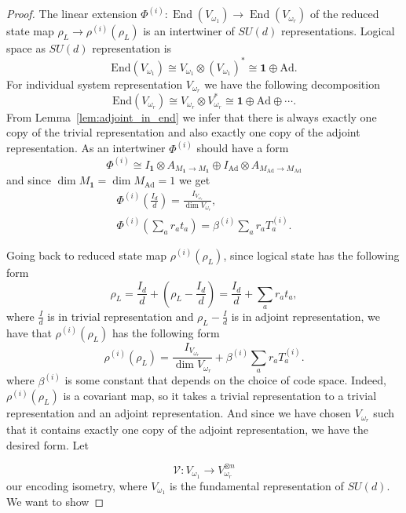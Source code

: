 \documentclass[10pt,twocolumn,superscriptaddress,aps,amsmath,amssymb,citeautoscript,floatfix,prx]{revtex4-2}
\theoremstyle{plain}
\theoremstyle{plain}
\theoremstyle{plain}
\theoremstyle{plain}
\theoremstyle{plain}
\theoremstyle{plain}
\theoremstyle{plain}
\theoremstyle{definition}
\theoremstyle{plain}
\begin{document}
\begin{appendix}
\begin{proof}
The linear extension $\Phi^{(i)}:\operatorname{End}(V_{\omega_1})\rightarrow \operatorname{End}(V_{\omega_r})$ of the reduced state map $\rho_L \rightarrow \rho^{(i)}\left(\rho_L\right)$ is an intertwiner of $SU(d)$ representations. 
Logical space as $SU(d)$ representation is
\[
     \text{End}(V_{\omega_1})\cong V_{\omega_1} \otimes (V_{\omega_1})^* \cong \mathbf{1} \oplus \mathrm{Ad}.
\]
For individual system representation $V_{\omega_r}$ we have the following decomposition
\[
    \text{End}(V_{\omega_r})\cong V_{\omega_r} \otimes V_{\omega_r}^* \cong \mathbf{1} \oplus \mathrm{Ad} \oplus \cdots.
\]
From Lemma~\ref{lem:adjoint_in_end} we infer that there is always exactly one copy of the trivial representation and also exactly one copy of the adjoint representation.
As an intertwiner $\Phi^{(i)}$ should have a form
\[
\Phi^{(i)}\cong I_{\mathbf{1}}\otimes A_{M_\mathbf{1}\rightarrow M_\mathbf{1}}\oplus I_{\mathrm{Ad}}\otimes A_{M_\mathrm{Ad}\rightarrow M_\mathrm{Ad}}
\]
and since $\dim M_\mathbf{1}=\dim M_\mathrm{Ad}=1$ we get
\begin{equation}
\begin{gathered}
        \Phi^{(i)}\left(\frac{I_d}{d}\right)=\frac{I_{V_{\omega_r}}}{\operatorname{dim} V_{\omega_r}},\\
        \Phi^{(i)}\left(\sum_a r_a t_a\right)=\beta^{(i)}\sum_a r_a T_a^{(i)}.
\end{gathered}
\end{equation}

Going back to reduced state map $\rho^{(i)}\left(\rho_L\right)$, since logical state has the following form
\[
     \rho_L=\frac{I_d}{d}+\left(\rho_L-\frac{I_d}{d}\right)=\frac{I_d}{d}+\sum_a r_a t_a,
\]
where $\frac{I}{d}$ is in trivial representation and $\rho_L-\frac{I}{d}$ is in adjoint representation, we have that $\rho^{(i)}\left(\rho_L\right)$ has the following form
\[
    \rho^{(i)}\left(\rho_L\right) = \frac{I_{V_{\omega_r}}}{\operatorname{dim} V_{\omega_r}}+\beta^{(i)} \sum_a r_a T_a^{(i)}.
\]
where $\beta^{(i)}$ is some constant that depends on the choice of code space.
Indeed, $\rho^{(i)}\left(\rho_L\right)$ is a covariant map, so it takes a trivial representation to a trivial representation and an adjoint representation.
And since we have chosen $V_{\omega_r}$ such that it contains exactly one copy of the adjoint representation, we have the desired form. Let

\[
    \mathcal{V}: V_{\omega_1} \rightarrow V_{\omega_r}^{\otimes n}
\]
our encoding isometry, where $V_{\omega_1}$ is the fundamental representation of $SU(d)$. 
We want to show


\end{proof}
\end{appendix}
\end{document}
